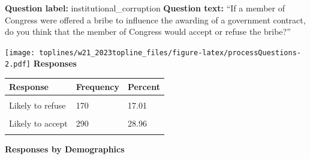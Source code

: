 \documentclass[]{article}
\begin{document}
\clearpage\pagebreak
\begin{flushleft} \textbf{Question label:} institutional\_corruption \break \break \textbf{Question text:} ``If a member of Congress were offered a bribe to influence the awarding of a government contract, do you think that the member of Congress would accept or refuse the bribe?'' \end{flushleft}

\texttt{[image: toplines/w21\_2023topline\_files/figure-latex/processQuestions-2.pdf]}
\textbf{Responses}

\begin{tabu} to 
\toprule
Response & Frequency & Percent\\
\midrule
{} &  & \\
Likely to refuse & 170 & 17.01\\
 &  & \\
Likely to accept & 290 & 28.96\\
 &  & \\
\bottomrule
\end{tabu}

\textbf{Responses by Demographics}\begingroup\fontsize{7}{9}\selectfont
\end{document}
